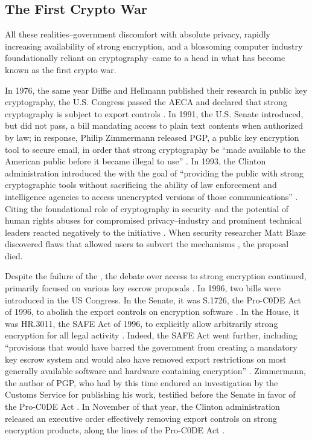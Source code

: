 \subsection{The First Crypto War}
\label{sec-history-cw1}

All these realities--government discomfort with absolute privacy, rapidly increasing availability of strong encryption,
and a blossoming computer industry foundationally reliant on cryptography--came to a head in what has become known as
the first crypto war.

In 1976, the same year Diffie and Hellmann published their research in public key cryptography, the U.S. Congress passed
the \ac{AECA} and declared that strong cryptography is subject to export controls \cite{kehl_right_2015}. In 1991, the
U.S. Senate introduced, but did not pass, a bill mandating access to plain text contents when authorized by law; in
response, Philip Zimmermann released \ac{PGP}, a public key encryption tool to secure email, in order that strong
cryptography be ``made available to the American public before it became illegal to use'' \cite{zimmermann_1996}. In
1993, the Clinton administration introduced the  \cite{press_1993} with the goal of ``providing the
public with strong cryptographic tools without sacrificing the ability of law enforcement and intelligence agencies to
access unencrypted versions of those communications'' \cite{thompson_2015}. Citing the foundational role of cryptography
in security--and the potential of human rights abuses for compromised privacy--industry and prominent technical leaders
reacted negatively to the initiative \cite{kehl_right_2015} \cite{zimmermann_1996}. When security researcher Matt Blaze
discovered flaws that allowed users to subvert the  mechanisms \cite{blaze_protocol_1994}, the
proposal died.

Despite the failure of the , the debate over access to strong encryption continued, primarily focused
on various key escrow proposals \cite{thompson_2015}. In 1996, two bills were introduced in the US Congress. In the
Senate, it was S.1726, the Pro-C0DE Act of 1996, to abolish the export controls on encryption software
\cite{burns_s1726_1996}. In the House, it was HR.3011, the SAFE Act of 1996, to explicitly allow arbitrarily strong
encryption for all legal activity \cite{goodlatte_hr3011_1996}. Indeed, the SAFE Act went further, including
``provisions that would have barred the government from creating a mandatory key escrow system and would also have
removed export restrictions on most generally available software and hardware containing encryption''
\cite{kehl_right_2015}. Zimmermann, the author of PGP, who had by this time endured an investigation by the Customs
Service for publishing his work, testified before the Senate in favor of the Pro-C0DE Act \cite{zimmermann_1996}. In
November of that year, the Clinton administration released an executive order effectively removing export controls on
strong encryption products, along the lines of the Pro-C0DE Act \cite{clinton_1996}.

